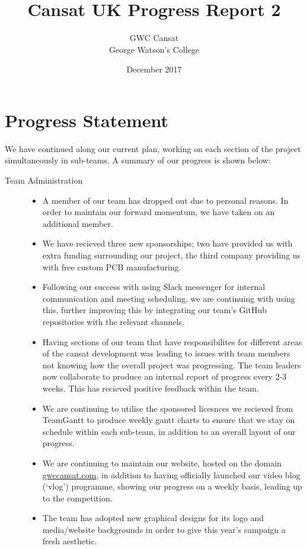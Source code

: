 \documentclass{report}
\title{\bf Cansat UK Progress Report 2}
\author{
	GWC Cansat\\
	George Watson's College	
}
\date{December 2017}
\begin{document}
\maketitle
\tableofcontents
{}

\chapter{Progress Statement}
	We have continued along our current plan, working on each 
	section of the project simultaneously in sub-teams. A summary 
	of our progress is shown below:

	\begin{description}
		\item[Team Administration] \hfill \begin{itemize}
			\item A member of our team has dropped out due to personal
			reasons. In order to maintain our forward momentum, we
			have taken on an additional member.
			\item We have recieved three new sponsorships; two have 
			provided us with extra funding surrounding our project,
			the third company providing us with free custom PCB 
			manufacturing.
			\item Following our success with using Slack messenger for 
			internal communication and meeting scheduling,
			we are continuing with using this, further improving this
			by integrating our team's GitHub repositories with the relevant
			channels.
			\item Having sections of our team that have responsibilites for
			different	areas of the cansat development was leading to issues
			with team members not knowing how the overall	project was 
			progressing. The team leaders now collaborate to produce an
			internal report of progress every 2-3 weeks. This has recieved
			positive feedback within the team.
			\item We are continuing to utilise the sponsored licesnces we 
			recieved from TeamGantt to produce weekly gantt charts
			to ensure that we stay on schedule within each sub-team, in
			addition to an overall layout of our progress.
			\item We are continuing to maintain our website, hosted on the
			domain \url{gwccansat.com}, in addition to having officially launched our
			video blog (`vlog') programme, showing our progress on a weekly
			basis, leading up to the competition.
			\item The team has adopted new graphical designs for its logo and
			media/website backgrounds in order to give this year's campaign a fresh
			aesthetic.
		\end{itemize}
		

\end{description}
\end{document}
